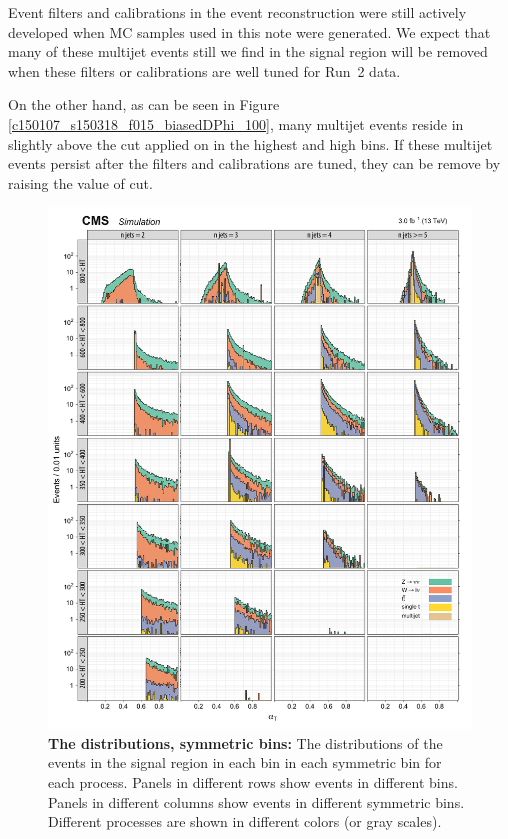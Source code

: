 Event filters and calibrations in the event reconstruction were still
actively developed when MC samples used in this note were generated.
We expect that many of these multijet events still we find in the
signal region will be removed when these filters or calibrations are
well tuned for Run~2 data.

On the other hand, as can be seen in Figure
\ref{c150107_s150318_f015_biasedDPhi_100}, many multijet events reside
in slightly above the cut applied on \bdphi in the highest \scalht and
high \njet bins. If these multijet events persist after the filters
and calibrations are tuned, they can be remove by raising the value of
\bdphi cut.





\begin{figure}[!h]
\centering
\includegraphics[scale=0.95]{figures/kiplots/c150107_s150318_f015_alphaT_100}
\caption{\textbf{\boldmath The \alphat distributions, symmetric \njet
bins:} The \alphat distributions of the events in the signal region in
each \scalht bin in each symmetric \njet bin for each process. Panels in
different rows show events in different \scalht bins. Panels in
different columns show events in different symmetric \njet bins.
Different processes are shown in different colors (or gray scales).}
\label{c150107_s150318_f015_alphaT_100}
\end{figure}

